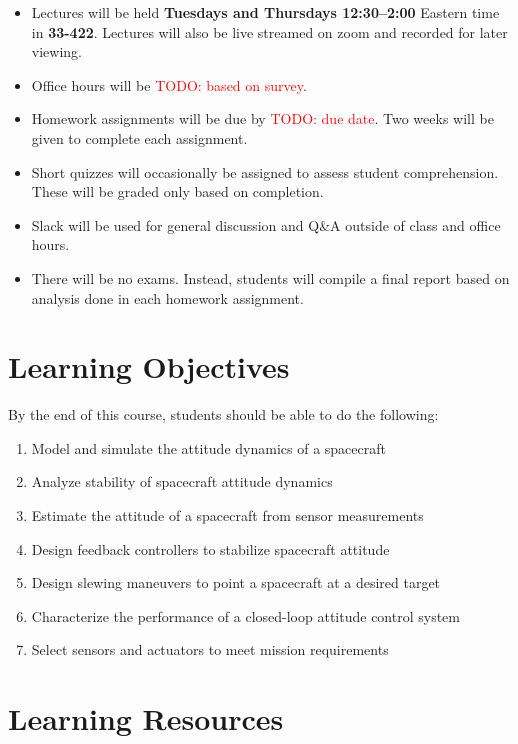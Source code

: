 \documentclass[11pt,letterpaper]{article}
\newcommand{\todo}[1]{\textcolor{red}{TODO: #1}}
\begin{document}
\begin{itemize}
	\item Lectures will be held \textbf{Tuesdays and Thursdays 12:30--2:00} Eastern time in \textbf{33-422}. Lectures will also be live streamed on zoom and recorded for later viewing.
	\item Office hours will be \todo{based on survey}.
	\item Homework assignments will be due by \todo{due date}. Two weeks will be given to complete each assignment.
	\item Short quizzes will occasionally be assigned to assess student comprehension. These will be graded only based on completion.
	\item Slack will be used for general discussion and Q\&A outside of class and office hours.
	\item There will be no exams. Instead, students will compile a final report based on analysis done in each homework assignment.
\end{itemize}

\newpage 
\section*{Learning Objectives}
By the end of this course, students should be able to do the following:
\begin{enumerate}
	\item Model and simulate the attitude dynamics of a spacecraft
	\item Analyze stability of spacecraft attitude dynamics
	\item Estimate the attitude of a spacecraft from sensor measurements
	\item Design feedback controllers to stabilize spacecraft attitude
	\item Design slewing maneuvers to point a spacecraft at a desired target
	\item Characterize the performance of a closed-loop attitude control system
	\item Select sensors and actuators to meet mission requirements
\end{enumerate}

\section*{Learning Resources}
\end{document}
